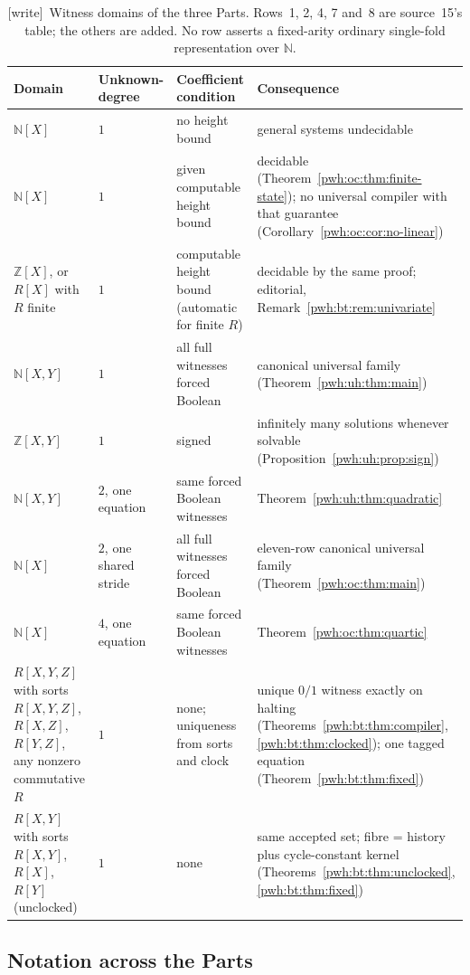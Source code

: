 \documentclass[11pt,letterpaper]{article}
\numberwithin{equation}{section}
\theoremstyle{definition}
\newcommand{\N}{\mathbb N}
\newcommand{\Z}{\mathbb Z}
\newcommand{\wtag}{\textup{[write]}}
\begin{document}
\begin{table}[ht]
\centering\small
\begin{tabular}{@{}P{0.25\textwidth}P{0.12\textwidth}P{0.22\textwidth}P{0.33\textwidth}@{}}
\toprule
Domain & Unknown-degree & Coefficient condition & Consequence\\
\midrule
$\N[X]$ & $1$ & no height bound & general systems undecidable~\cite{uh:Narendran}\\
$\N[X]$ & $1$ & given computable height bound & decidable (Theorem~\ref{pwh:oc:thm:finite-state}); no universal compiler with that guarantee (Corollary~\ref{pwh:oc:cor:no-linear})\\
$\Z[X]$, or $R[X]$ with $R$ finite & $1$ & computable height bound (automatic for finite $R$) & decidable by the same proof; editorial, Remark~\ref{pwh:bt:rem:univariate}\\
$\N[X,Y]$ & $1$ & all full witnesses forced Boolean & canonical universal family (Theorem~\ref{pwh:uh:thm:main})\\
$\Z[X,Y]$ & $1$ & signed & infinitely many solutions whenever solvable (Proposition~\ref{pwh:uh:prop:sign})\\
$\N[X,Y]$ & $2$, one equation & same forced Boolean witnesses & Theorem~\ref{pwh:uh:thm:quadratic}\\
$\N[X]$ & $2$, one shared stride & all full witnesses forced Boolean & eleven-row canonical universal family (Theorem~\ref{pwh:oc:thm:main})\\
$\N[X]$ & $4$, one equation & same forced Boolean witnesses & Theorem~\ref{pwh:oc:thm:quartic}\\
$R[X,Y,Z]$ with sorts $R[X,Y,Z]$, $R[X,Z]$, $R[Y,Z]$, any nonzero commutative $R$ & $1$ & none; uniqueness from sorts and clock & unique $0/1$ witness exactly on halting (Theorems~\ref{pwh:bt:thm:compiler}, \ref{pwh:bt:thm:clocked}); one tagged equation (Theorem~\ref{pwh:bt:thm:fixed})\\
$R[X,Y]$ with sorts $R[X,Y]$, $R[X]$, $R[Y]$ (unclocked) & $1$ & none & same accepted set; fibre = history plus cycle-constant kernel (Theorems~\ref{pwh:bt:thm:unclocked}, \ref{pwh:bt:thm:fixed})\\
\bottomrule
\end{tabular}
\caption{\wtag\ Witness domains of the three Parts. Rows~1, 2, 4, 7 and~8 are source~15's table; the others are added. No row asserts a fixed-arity ordinary single-fold representation over $\N$.}\label{pwh:tab:ledger}
\end{table}

\subsection{Notation across the Parts}\label{pwh:sec:notation}
\end{document}
